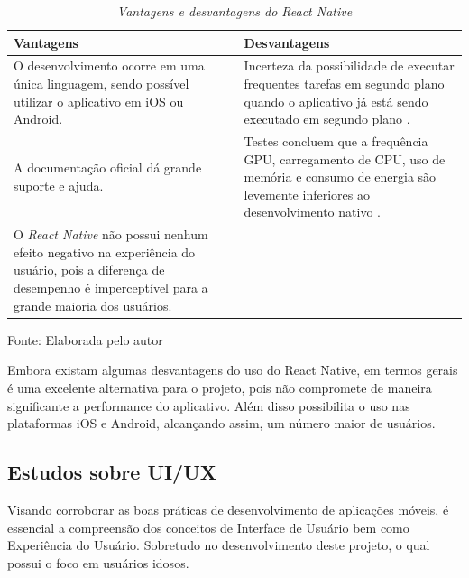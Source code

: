 \begin{table}[!ht]
\centering
\caption{\textit{Vantagens e desvantagens do React Native}}
\centering
\footnotesize
\begin{tabular}{p{7cm} p{7cm}}
\toprule
\textbf{Vantagens} \citep{danielsson2016} & \textbf{Desvantagens}                          
\\ \midrule
O desenvolvimento ocorre em uma única linguagem, sendo possível utilizar o aplicativo em iOS ou Android.
& 
Incerteza da possibilidade de executar frequentes tarefas em segundo plano quando o aplicativo já está sendo executado em segundo plano \citep{sodebergJohansson}.
\\ \midrule

A documentação oficial dá grande suporte e ajuda.
& 
Testes concluem que a frequência GPU, carregamento de CPU, uso de memória e consumo de energia são levemente inferiores ao desenvolvimento nativo \citep{danielsson2016}.
\\ \midrule

O \textit{React Native} não possui nenhum efeito negativo na experiência do usuário, pois a diferença de desempenho é imperceptível para a grande maioria dos usuários.
& 

\\ \midrule

\end{tabular}
\label{tab:vanDesvRN}

Fonte: Elaborada pelo autor
\end{table}

Embora existam algumas desvantagens do uso do React Native, em termos gerais é uma excelente alternativa para o projeto, pois não compromete de maneira significante a performance do aplicativo. Além disso possibilita o uso nas plataformas iOS e Android, alcançando assim, um número maior de usuários.

\subsection{Estudos sobre UI/UX}
Visando corroborar as boas práticas de desenvolvimento de aplicações móveis, é essencial a compreensão dos conceitos de Interface de Usuário bem como Experiência do Usuário. Sobretudo no desenvolvimento deste projeto, o qual possui o foco em usuários idosos.

